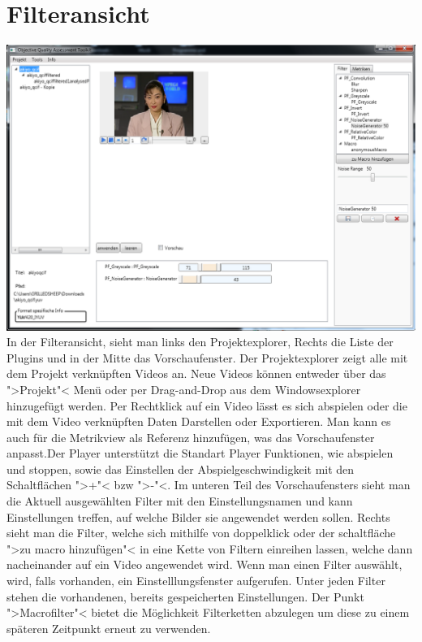 \chapter{Filteransicht}
\includegraphics[scale=0.55]{bilder/Filter.png}\\[5ex]
In der Filteransicht, sieht man links den Projektexplorer, Rechts die Liste der Plugins und in der Mitte das Vorschaufenster.
Der Projektexplorer zeigt alle mit dem Projekt verknüpften Videos an. Neue Videos können entweder über das ">Projekt"< Menü oder per Drag-and-Drop aus dem Windowsexplorer hinzugefügt werden.
Per Rechtklick auf ein Video lässt es sich abspielen oder die mit dem Video verknüpften Daten Darstellen oder Exportieren. Man kann es auch für die Metrikview als Referenz hinzufügen, was das Vorschaufenster anpasst.Der Player unterstützt die Standart Player Funktionen, wie abspielen und stoppen, sowie das Einstellen der Abspielgeschwindigkeit mit den Schaltflächen ">+"< bzw ">-"<. Im unteren Teil des Vorschaufensters sieht man die Aktuell ausgewählten Filter mit den Einstellungsnamen und kann Einstellungen treffen, auf welche Bilder sie angewendet werden sollen. Rechts sieht man die Filter, welche sich mithilfe von doppelklick oder der schaltfläche ">zu macro hinzufügen"< in eine Kette von Filtern einreihen lassen, welche dann nacheinander auf ein Video angewendet wird. Wenn man einen  Filter auswählt, wird, falls vorhanden, ein Einstelllungsfenster aufgerufen. Unter jeden Filter stehen die vorhandenen, bereits gespeicherten Einstellungen. Der Punkt ">Macrofilter"< bietet die Möglichkeit Filterketten abzulegen um diese zu einem späteren Zeitpunkt erneut zu verwenden.


